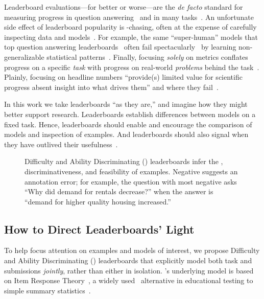 Leaderboard evaluations---for better or worse---are the
\textit{de facto} standard for measuring progress in question
answering~\citep{squad16} and in many \nlp{}
tasks~\citep{wang2019superglue}.
An unfortunate side effect of leaderboard popularity is -chasing, often at the expense of carefully inspecting data and models~\citep{linzen2020progress}.
For example, the same  ``super-human'' models that top question answering leaderboards~\citep{najberg-18} often fail spectacularly~\citep{feng2018rawr,wallace2019universal} by learning non-generalizable statistical patterns~\citep{mccoy2019heuristics,niven2019probing}.
Finally, focusing \textit{solely} on metrics conflates progress on a specific \emph{task} with progress on real-world \nlp{} \emph{problems} behind the task~\citep{bender2020climbing}.
Plainly, focusing on headline  numbers ``provide(s) limited value for scientific progress absent insight into what drives them'' and where they fail~\citep{lipton2019troubling}.

In this work we take leaderboards ``as they are,'' and imagine how they
might better support research.
Leaderboards establish differences between
models on a fixed task.
Hence, leaderboards should enable and encourage the comparison of models and
inspection of examples.
And leaderboards should also signal when they have outlived their usefulness~\citep{boydgraber2020nerds}.

\begin{figure}[t]
  \centering
  \caption{
    Difficulty and Ability Discriminating (\name{}) leaderboards infer the \diff{}, discriminativeness, and feasibility of examples.
    Negative \discability{} suggests an annotation error; for example, the question with most negative \discability{}
    asks ``Why did demand for rentals decrease?'' when the answer is ``demand for higher quality housing increased.''
  }
  \label{fig:irt-dist}
\end{figure}

\subsection{How to Direct Leaderboards' Light}

To help focus attention on examples and models of interest, we propose
Difficulty and Ability Discriminating (\name{}) leaderboards that
explicitly model both task and submissions \emph{jointly}, rather than
either in isolation.
\name{}'s underlying model is based on Item Response Theory~\citep[,
reviewed in \S\ref{ch:isicle:lead}]{lord1968test,baker2001irt}, a widely
used~\citep{van2016assess} alternative in educational testing to simple
summary statistics~\citep{edgeworth1888exams}.

